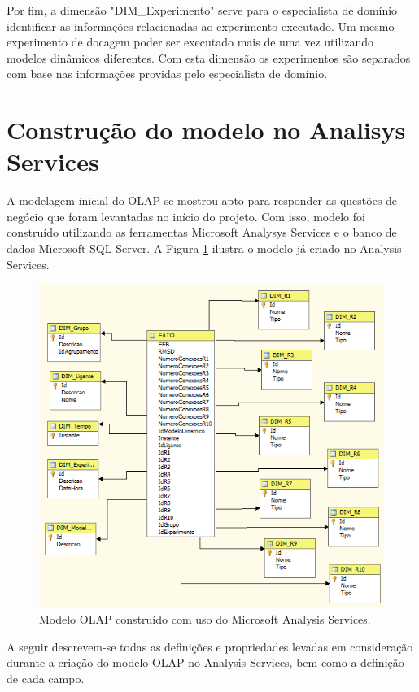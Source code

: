 \begin{itemize}
Por fim, a dimensão "DIM\_Experimento" serve para o especialista de domínio identificar as informações relacionadas ao experimento executado. Um mesmo experimento de docagem poder ser executado mais de uma vez utilizando modelos dinâmicos diferentes. Com esta dimensão os experimentos são separados com base nas informações providas pelo especialista de domínio.


\section{Construção do modelo no Analisys Services}

A modelagem inicial do OLAP se mostrou apto para responder as questões de negócio que foram levantadas no início do projeto. Com isso, modelo foi construído utilizando as ferramentas Microsoft Analysys Services e o banco de dados Microsoft SQL Server. A Figura \ref{fig:ModeloOLAP} ilustra o modelo já criado no Analysis Services.

\begin{figure}[h]
        \center
        \includegraphics[scale=0.7]{images/ModelagemOLAP.PNG}
        \caption{Modelo OLAP construído com uso do Microsoft Analysis Services.}
        \label{fig:ModeloOLAP}
\end{figure}

A seguir descrevem-se todas as definições e propriedades levadas em consideração durante a criação do modelo OLAP no Analysis Services, bem como a definição de cada campo.


\end{itemize}
